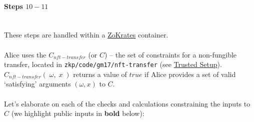 \documentclass{article}
\begin{document}
\paragraph{Steps $10 - 11$}
\ \\
These steps are handled within a \hyperref[sec:zokrates]{ZoKrates} container.\\
\\
Alice uses the $C_{nft-transfer}$ (or $C$) -- the set of constraints for a non-fungible transfer, located in \texttt{zkp/code/gm17/nft-transfer} (see \hyperref[sec:trustedSetup]{Trusted Setup}). $C_{nft-transfer}(\;\omega,\;x\;)$ returns a value of $true$ if Alice provides a set of valid `satisfying' arguments $(\omega, x)$ to $C$.\\
\\
Let's elaborate on each of the checks and calculations constraining the inputs to $C$ (we highlight public inputs in \textbf{bold} below):
\end{document}

